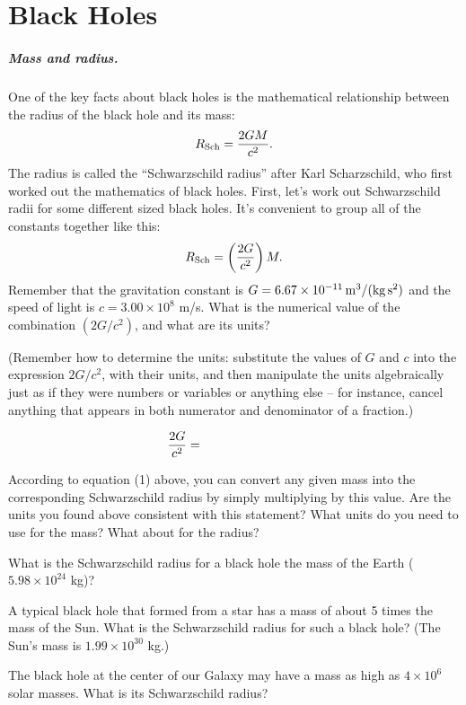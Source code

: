 \chapter{Black Holes}


\paragraph{Mass and radius.}
One of the key facts about black holes is the mathematical relationship
between the radius of the black hole and its mass:
$$
R_{\rm Sch}={2GM\over c^2}.
$$
The radius is called the ``Schwarzschild radius'' after Karl Scharzschild,
who first worked out the mathematics of black holes.  First, let's work out
Schwarzschild radii for some different sized black holes.  It's convenient
to group all of the constants together like this:
\begin{equation}
R_{\rm Sch}=\left(2G\over c^2\right)M.
\end{equation}
Remember that the gravitation constant is $G=6.67\times 10^{-11}\,{\rm
m^3/(kg\,s^2)}$ and the speed of light is $c=3.00\times 10^8$ m/s.
What is the numerical value of the combination $(2G/c^2)$, and what
are its units?  

(Remember how to determine the units: substitute the values of $G$
and $c$ into the expression $2G/c^2$, with their units, and then manipulate
the units algebraically just as if they were numbers or variables or anything
else -- for instance, cancel anything that appears in both numerator and
denominator of a fraction.)

\vskip 0.3in
$$
{2G\over c^2}=\qquad\qquad\qquad\qquad
$$
\vskip 0.3in

According to equation (1) above, you can convert any given mass into
the corresponding Schwarzschild radius by simply multiplying by this
value.  Are the units you found above consistent with this statement?
What units do you need to use for the mass?  What about for the radius?

\vskip 1in

What is the Schwarzschild radius for a black hole the mass of the Earth 
($5.98\times 10^{24}$ kg)?

\vskip 1in

A typical black hole that formed from a star has a mass of about 5 times
the mass of the Sun.  What is the Schwarzschild radius for such
a black hole?
(The Sun's mass is $1.99\times 10^{30}$ kg.)

\vskip 1in

The black hole at the center of our Galaxy may have a mass as high as 
$4\times 10^6$ solar masses.  What is its Schwarzschild radius?

